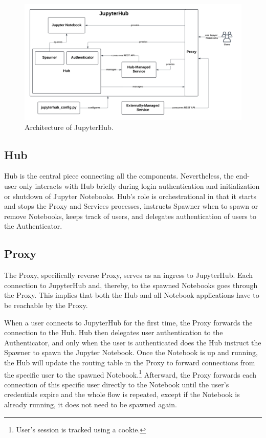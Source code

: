 \documentclass[
  digital,     %
  oneside,     %
  nosansbold,  %
  nocolorbold, %
  lof,         %
  nolot,         %
]{fithesis4}
\begin{document}
\begin{figure}[H]
  \begin{center}
  \includegraphics[width=\textwidth]{figures/jupyer-hub-architecture.png}
  \end{center}
  \caption{Architecture of JupyterHub. }
  \label{fig:jupyter-hub-arch}
\end{figure}

\subsection{Hub}
Hub is the central piece connecting all the components. Nevertheless, the end-user only interacts with Hub briefly during login authentication and initialization or shutdown of Jupyter Notebooks. Hub's role is orchestrational in that it starts and stops the Proxy and Services processes, instructs Spawner when to spawn or remove Notebooks, keeps track of users, and delegates authentication of users to the Authenticator.

\subsection{Proxy}
The Proxy, specifically reverse Proxy, serves as an ingress to JupyterHub. Each connection to JupyterHub and, thereby, to the spawned Notebooks goes through the Proxy. This implies that both the Hub and all Notebook applications have to be reachable by the Proxy\cite{jupyterhub_arch}.

When a user connects to JupyterHub for the first time, the Proxy forwards the connection to the Hub. Hub then delegates user authentication to the Authenticator, and only when the user is authenticated does the Hub instruct the Spawner to spawn the Jupyter Notebook. Once the Notebook is up and running, the Hub will update the routing table in the Proxy to forward connections from the specific user to the spawned Notebook.\footnote{User's session is tracked using a cookie.} Afterward, the Proxy forwards each connection of this specific user directly to the Notebook until the user's credentials expire and the whole flow is repeated, except if the Notebook is already running, it does not need to be spawned again.
\end{document}

